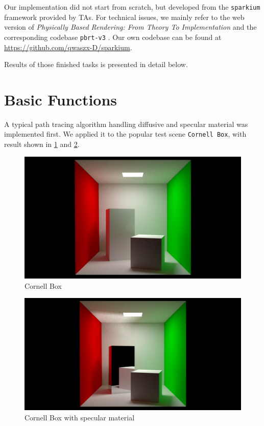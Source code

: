 \documentclass[acmtog]{acmart}
\begin{document}
Our implementation did not start from scratch, but developed from the \verb|sparkium| framework provided by TAs. For technical issues, we mainly refer to the web version of \textit{Physically Based Rendering: From Theory To Implementation} \cite{pbr3rd} and the corresponding codebase \verb|pbrt-v3| \cite{pbrt}. Our own codebase can be found at \url{https://github.com/qwaszx-D/sparkium}.

Results of those finished tasks is presented in detail below.

\section{Basic Functions}

A typical path tracing algorithm handling diffusive and specular material was implemented first. We applied it to the popular test scene \verb|Cornell Box|, with result shown in \ref{cornell128} and \ref{cornell_specular}.

\begin{figure}[h]
	\centering
	\includegraphics[width=\linewidth]{cornell128}
	\caption{Cornell Box}
	\label{cornell128}
\end{figure}

\begin{figure}[h]
	\centering
	\includegraphics[width=\linewidth]{cornell_specular}
	\caption{Cornell Box with specular material}
	\label{cornell_specular}
\end{figure}
\end{document}
